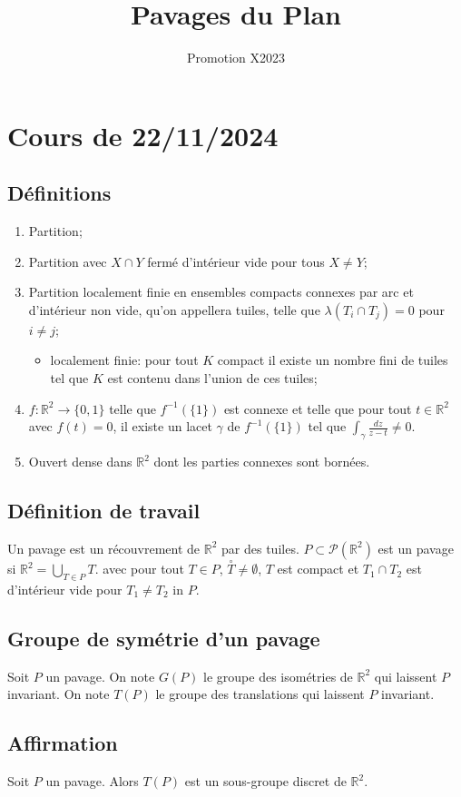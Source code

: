 \documentclass{article}
\title{Pavages du Plan}
\author{Promotion X2023}
\newcommand{\R}{\mathbb{R}}
\newcommand{\interior}[1]{\overset{\circ}{#1}}
\begin{document}
\maketitle
\section{Cours de 22/11/2024}
\subsection{Définitions}
\begin{enumerate}
    \item Partition;
    \item Partition avec $X \cap Y$ fermé d'intérieur vide pour tous $X \neq Y$;
    \item Partition localement finie en ensembles compacts connexes par arc et d'intérieur non vide, qu'on appellera tuiles, telle que $\lambda(T_i \cap T_j) = 0$ pour $i \neq j$;
    \begin{itemize}
        \item localement finie: pour tout $K$ compact il existe un nombre fini de tuiles tel que $K$ est contenu dans l'union de ces tuiles;
    \end{itemize}
    \item $f \colon \R^2 \to \{0, 1\}$ telle que $f^{-1}(\{1\})$ est connexe et telle que pour tout $t \in \R^2$ avec $f(t) = 0$, il existe un lacet $\gamma$ de $f^{-1}(\{1\})$ tel que $\int_\gamma \frac{dz}{z - t} \neq 0$.
    \item Ouvert dense dans $\R^2$ dont les parties connexes sont bornées.
\end{enumerate}
\subsection{Définition de travail}
Un pavage est un récouvrement de $\R^2$ par des tuiles. $P \subset \mathcal{P}(\R^2)$ est un pavage si $\R^2 = \bigcup_{T \in P} T$. avec pour tout $T \in P$, $\interior{T} \ne \emptyset$, $T$ est compact et $T_1 \cap T_2$ est d'intérieur vide pour $T_1 \ne T_2$ in $P$.
\subsection{Groupe de symétrie d'un pavage}
Soit $P$ un pavage. On note $G(P)$ le groupe des isométries de $\R^2$ qui laissent $P$ invariant. On note $T(P)$ le groupe des translations qui laissent $P$ invariant.
\subsection{Affirmation}
Soit $P$ un pavage. Alors $T(P)$ est un sous-groupe discret de $\R^2$.
\end{document}
